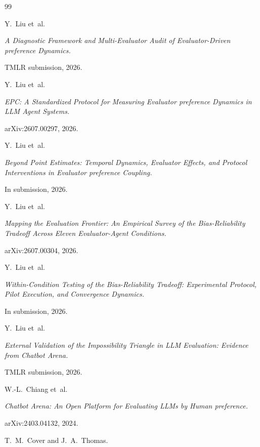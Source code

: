 \documentclass[11pt]{article}
\begin{document}
\begin{thebibliography}{99}

 Y.~Liu et~al.

\newblock \textit{A Diagnostic Framework and Multi-Evaluator Audit of Evaluator-Driven preference Dynamics.}

\newblock TMLR submission, 2026.

 Y.~Liu et~al.

\newblock \textit{EPC: A Standardized Protocol for Measuring Evaluator preference Dynamics in LLM Agent Systems.}

\newblock arXiv:2607.00297, 2026.

 Y.~Liu et~al.

\newblock \textit{Beyond Point Estimates: Temporal Dynamics, Evaluator Effects, and Protocol Interventions in Evaluator preference Coupling.}

\newblock In submission, 2026.

 Y.~Liu et~al.

\newblock \textit{Mapping the Evaluation Frontier: An Empirical Survey of the Bias-Reliability Tradeoff Across Eleven Evaluator-Agent Conditions.}

\newblock arXiv:2607.00304, 2026.

 Y.~Liu et~al.

\newblock \textit{Within-Condition Testing of the Bias-Reliability Tradeoff: Experimental Protocol, Pilot Execution, and Convergence Dynamics.}

\newblock In submission, 2026.

 Y.~Liu et~al.

\newblock \textit{External Validation of the Impossibility Triangle in LLM Evaluation: Evidence from Chatbot Arena.}

\newblock TMLR submission, 2026.

 W.-L.~Chiang et~al.

\newblock \textit{Chatbot Arena: An Open Platform for Evaluating LLMs by Human preference.}

\newblock arXiv:2403.04132, 2024.

 T.~M.~Cover and J.~A.~Thomas.


\end{thebibliography}
\end{document}
